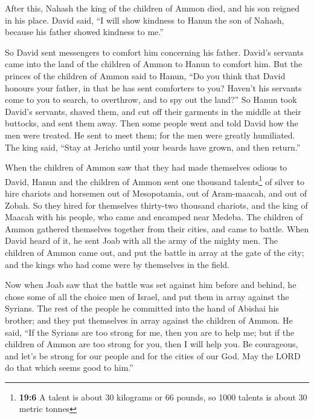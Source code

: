  After this, Nahash the king of the children of Ammon
died, and his son reigned in his place.  David said, ``I
will show kindness to Hanun the son of Nahash, because his father showed
kindness to me.''

So David sent messengers to comfort him concerning his father. David's
servants came into the land of the children of Ammon to Hanun to comfort
him.  But the princes of the children of Ammon said to
Hanun, ``Do you think that David honours your father, in that he has
sent comforters to you? Haven't his servants come to you to search, to
overthrow, and to spy out the land?''  So Hanun took
David's servants, shaved them, and cut off their garments in the middle
at their buttocks, and sent them away.  Then some people
went and told David how the men were treated. He sent to meet them; for
the men were greatly humiliated. The king said, ``Stay at Jericho until
your beards have grown, and then return.''

 When the children of Ammon saw that they had made
themselves odious to David, Hanun and the children of Ammon sent one
thousand talents\footnote{\textbf{19:6} A talent is about 30 kilograms
  or 66 pounds, so 1000 talents is about 30 metric tonnes} of silver to
hire chariots and horsemen out of Mesopotamia, out of Aram-maacah, and
out of Zobah.  So they hired for themselves thirty-two
thousand chariots, and the king of Maacah with his people, who came and
encamped near Medeba. The children of Ammon gathered themselves together
from their cities, and came to battle.  When David heard
of it, he sent Joab with all the army of the mighty men. 
The children of Ammon came out, and put the battle in array at the gate
of the city; and the kings who had come were by themselves in the field.

 Now when Joab saw that the battle was set against him
before and behind, he chose some of all the choice men of Israel, and
put them in array against the Syrians.  The rest of the
people he committed into the hand of Abishai his brother; and they put
themselves in array against the children of Ammon.  He
said, ``If the Syrians are too strong for me, then you are to help me;
but if the children of Ammon are too strong for you, then I will help
you.  Be courageous, and let's be strong for our people
and for the cities of our God. May the LORD do that which seems good to
him.''

